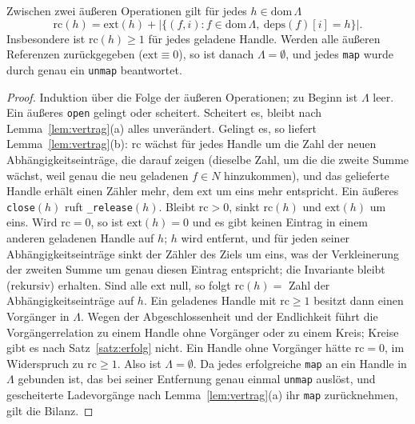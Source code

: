\begin{satz}
	\label{satz:refcount}
	Zwischen zwei äußeren Operationen gilt für jedes $h\in\mathrm{dom}\,\Lambda$
	\[
	\mathrm{rc}(h)=\mathrm{ext}(h)+\bigl|\{(f,i): f\in\mathrm{dom}\,\Lambda,\ \mathrm{deps}(f)[i]=h\}\bigr|.
	\]
	Insbesondere ist $\mathrm{rc}(h)\ge1$ für jedes geladene Handle. Werden alle äußeren Referenzen zurückgegeben ($\mathrm{ext}\equiv0$), so ist danach $\Lambda=\emptyset$, und jedes \texttt{map} wurde durch genau ein \texttt{unmap} beantwortet.
\end{satz}

\begin{proof}
	Induktion über die Folge der äußeren Operationen; zu Beginn ist $\Lambda$ leer. Ein äußeres \texttt{open} gelingt oder scheitert. Scheitert es, bleibt nach Lemma~\ref{lem:vertrag}(a) alles unverändert. Gelingt es, so liefert Lemma~\ref{lem:vertrag}(b): $\mathrm{rc}$ wächst für jedes Handle um die Zahl der neuen Abhängigkeitseinträge, die darauf zeigen (dieselbe Zahl, um die die zweite Summe wächst, weil genau die neu geladenen $f\in N$ hinzukommen), und das gelieferte Handle erhält einen Zähler mehr, dem $\mathrm{ext}$ um eins mehr entspricht. Ein äußeres \texttt{close}$(h)$ ruft \texttt{\_release}$(h)$. Bleibt $\mathrm{rc}>0$, sinkt $\mathrm{rc}(h)$ und $\mathrm{ext}(h)$ um eins. Wird $\mathrm{rc}=0$, so ist $\mathrm{ext}(h)=0$ und es gibt keinen Eintrag in einem anderen geladenen Handle auf $h$; $h$ wird entfernt, und für jeden seiner Abhängigkeitseinträge sinkt der Zähler des Ziels um eins, was der Verkleinerung der zweiten Summe um genau diesen Eintrag entspricht; die Invariante bleibt (rekursiv) erhalten. Sind alle $\mathrm{ext}$ null, so folgt $\mathrm{rc}(h)=$ Zahl der Abhängigkeitseinträge auf $h$. Ein geladenes Handle mit $\mathrm{rc}\ge1$ besitzt dann einen Vorgänger in $\Lambda$. Wegen der Abgeschlossenheit und der Endlichkeit führt die Vorgängerrelation zu einem Handle ohne Vorgänger oder zu einem Kreis; Kreise gibt es nach Satz~\ref{satz:erfolg} nicht. Ein Handle ohne Vorgänger hätte $\mathrm{rc}=0$, im Widerspruch zu $\mathrm{rc}\ge1$. Also ist $\Lambda=\emptyset$. Da jedes erfolgreiche \texttt{map} an ein Handle in $\Lambda$ gebunden ist, das bei seiner Entfernung genau einmal \texttt{unmap} auslöst, und gescheiterte Ladevorgänge nach Lemma~\ref{lem:vertrag}(a) ihr \texttt{map} zurücknehmen, gilt die Bilanz.
\end{proof}

